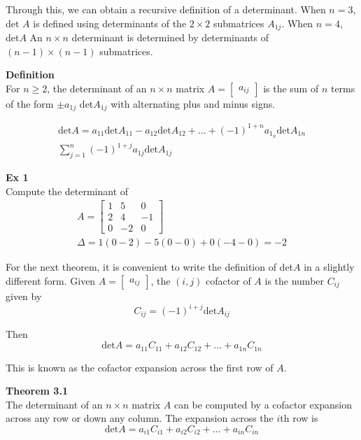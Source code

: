 \documentclass{article}
\begin{document}
  Through this, we can obtain a recursive definition of a determinant. When $ n=3 $, det $ A $ is defined using determinants of the $ 2 \times 2 $ submatrices $ A_{1j} $. When $ n=4 $, det$ A $ An $ n \times n $ determinant is determined by determinants of $ (n-1) \times (n-1) $ submatrices.
  
  \textbf{Definition}\\
  For $ n \ge 2 $, the determinant of an $ n \times n $ matrix $ A = \begin{bmatrix}
    a_{ij}
  \end{bmatrix} $ is the sum of $ n $ terms of the form $ \pm a_{1j} $ det$ A_{1j} $ with alternating plus and minus signs.

  \[
    \begin{gathered}
    \text{det}A= a_{11} \text{det}A_{11}-a_{12} \text{det}A_{12}+...+(-1)^{1+n}a_{1_n}\text{det}A_{1n}\\
    \sum^{n}_{j=1} (-1)^{1+j}a_{1j}\text{det}A_{1j}
    \end{gathered}
  \]

  \textbf{Ex 1}\\
  Compute the determinant of
  \[
    \begin{gathered}
    A = \begin{bmatrix}
      1 &5 &0\\
      2 &4 &-1\\
      0 &-2 &0
    \end{bmatrix}\\
    \Delta = 1(0-2)-5(0-0)+0(-4-0)=\boxed{-2}
    \end{gathered}
  \]

  For the next theorem, it is convenient to write the definition of det$ A $ in a slightly different form. Given $ A= \begin{bmatrix}
    a_{ij}
  \end{bmatrix} $, the $ (i,j) $ cofactor of $ A $ is the number $ C_{ij} $ given by
  \[
    C_{ij}=(-1)^{i+j} \text{det}A_{ij}
  \]

  Then
  \[
    \text{det}A = a_{11}C_{11}+a_{12}C_{12}+...+a_{1n}C_{1n}
  \]
  
  This is known as the cofactor expansion across the first row of $ A $.
  
  \textbf{Theorem 3.1}\\
  The determinant of an $ n \times n $ matrix $ A $ can be computed by a cofactor expansion across any row or down any column. The expansion across the $ i $th row is 
  \[
    \text{det}A = a_{i1}C_{i1}+a_{i2}C_{i2}+...+a_{in}C_{in}
  \]
\end{document}

